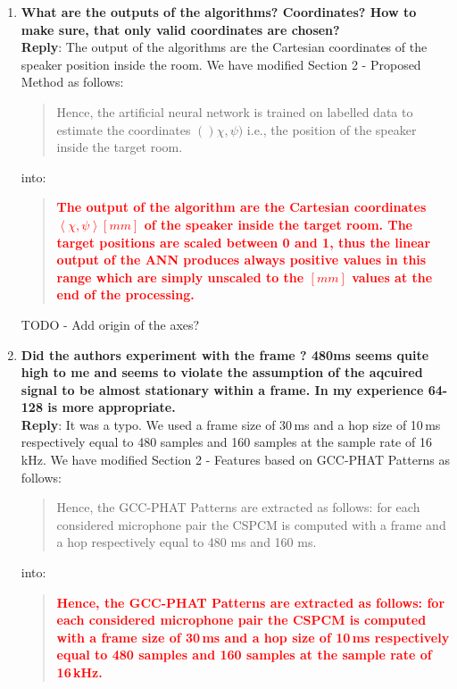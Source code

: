 \documentclass[11pt, technote, letterpaper, oneside, onecolumn]{IEEEtran}
\begin{document}
\begin{enumerate}

\item \textbf{What are the outputs of the algorithms? Coordinates? How to make sure, that only valid coordinates are chosen?\\}
\textbf{Reply}: The output of the algorithms are the Cartesian coordinates of the speaker position inside the room. We have modified Section 2 - Proposed Method as follows:
\begin{quote}
	Hence, the artificial neural network is trained on labelled data to estimate the coordinates $()\chi,\psi)$ i.e., the position of the speaker inside the target room.
\end{quote}
into:
\begin{quote}
	\textcolor{red}{\textbf{The output of the algorithm are the Cartesian coordinates $\left \langle \chi,\psi \right \rangle \left [mm\right ]$ of the speaker inside the target room. The target positions are scaled between 0 and 1, thus the linear output of the ANN produces always positive values in this range which are simply unscaled to the $\left [mm\right ]$ values at the end of the processing.}}
\end{quote}
TODO - Add origin of the axes?


\item \textbf{Did the authors experiment with the frame ? 480ms seems quite high to me and seems to violate the assumption of the aqcuired signal to be almost stationary within a frame. In my experience 64-128 is more appropriate.\\}
\textbf{Reply}: It was a typo. We used a frame size of 30\,ms and a hop size of 10\,ms respectively equal to 480 samples and 160 samples at the sample rate of 16\,kHz. We have modified Section 2 - Features based on GCC-PHAT Patterns as follows:

\begin{quote}
	Hence, the GCC-PHAT Patterns are extracted as follows: for each considered microphone pair the CSPCM is computed with a frame and a hop respectively equal to 480 ms and 160 ms.
\end{quote}
into:
\begin{quote}
	\textcolor{red}{\textbf{Hence, the GCC-PHAT Patterns are extracted as follows: for each considered microphone pair the CSPCM is computed with a frame size of 30\,ms and a hop size of 10\,ms respectively equal to 480 samples and 160 samples at the sample rate of 16\,kHz.}}
\end{quote}



\end{enumerate}
\end{document}
